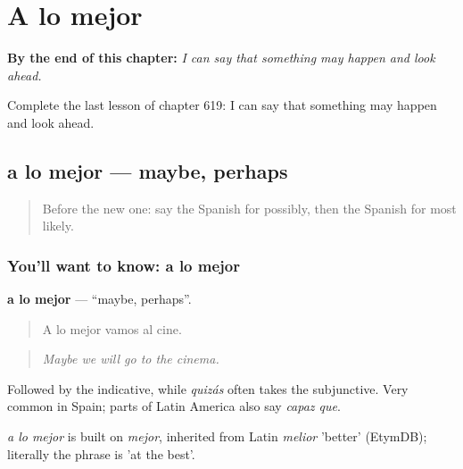 
\chapter{A lo mejor}
\label{ch:es-a-lo-mejor}

\begin{chapteropening}
\textbf{By the end of this chapter:} \emph{I can say that something may happen and look ahead.}

Complete the last lesson of chapter 619: I can say that something may happen and look ahead.
\end{chapteropening}

\section[a lo mejor]{a lo mejor — maybe, perhaps}

\label{lesson:ES-C619-a-lo-mejor}



\begin{quote}
Before the new one: say the Spanish for possibly, then the Spanish for most likely.
\end{quote}

\subsection*{You'll want to know: a lo mejor}
\textbf{a lo mejor} — \textquotedblleft{}maybe, perhaps\textquotedblright{}.

\begin{quote}
A lo mejor vamos al cine.
\end{quote}

\begin{quote}
\emph{Maybe we will go to the cinema.}
\end{quote}

Followed by the indicative, while \emph{quizás} often takes the subjunctive. Very common in Spain; parts of Latin America also say \emph{capaz que}.

\begin{cousinweb}
\emph{a lo mejor} is built on \emph{mejor}, inherited from Latin \emph{melior} 'better' (EtymDB); literally the phrase is 'at the best'.
\end{cousinweb}

